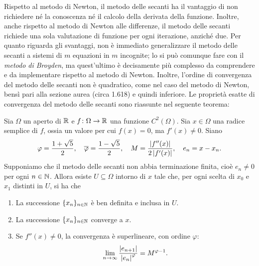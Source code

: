 Rispetto al metodo di Newton, il metodo delle secanti ha il vantaggio
di non richiedere né la conoscenza né il calcolo della derivata della funzione.
Inoltre, anche rispetto al metodo di Newton alle differenze,
il metodo delle secanti richiede una sola valutazione di funzione
per ogni iterazione, anziché due.
Per quanto riguarda gli svantaggi, non è immediato generalizzare
il metodo delle secanti a sistemi di $m$ equazioni in $m$ incognite;
lo si può comunque fare con il \emph{metodo di Broyden},
ma quest'ultimo è decisamente più complesso da comprendere
e da implementare rispetto al metodo di Newton.
Inoltre, l'ordine di convergenza del metodo delle secanti non è quadratico,
come nel caso del metodo di Newton, bensì pari alla sezione aurea
(circa 1.618) e quindi inferiore.
Le proprietà esatte di convergenza del metodo delle secanti sono riassunte
nel seguente teorema:

\begin{teor} \label{teor:convergenza-superlineare-secanti}
Sia $\Omega$ un aperto di $\mathbb{R}$ e $f \colon \Omega \to \mathbb{R}$ una funzione $C^2(\Omega)$.
Sia $x \in \Omega$ una radice semplice di $f$,
ossia un valore per cui $f(x) = 0$, ma $f'(x) \neq 0$.
Siano
\[
\varphi = \frac{1+\sqrt{5}}{2},
\quad \overline{\varphi} = \frac{1-\sqrt{5}}{2},
\quad M = \frac{\left\lvert f''(x)\right\rvert}{2\left\lvert f'(x)\right\rvert},
\quad e_n = x - x_n.
\]
Supponiamo che il metodo delle secanti non
abbia terminazione finita, cioè $e_n \neq 0$ per ogni $n \in \mathbb{N}$.
Allora esiste $U \subseteq \Omega$ intorno di $x$ tale che,
per ogni scelta di $x_0$ e $x_1$ distinti in $U$, si ha che
\begin{enumerate}
\item La successione $\{x_n\}_{n\in\mathbb{N}}$ è ben definita
	e inclusa in $U$.
\item La successione $\{x_n\}_{n\in\mathbb{N}}$ converge a $x$.
\item Se $f''(x) \neq 0$, la convergenza è superlineare, con ordine $\varphi$:
	\[ \lim_{n \to \infty} \frac{\left\lvert e_{n+1}\right\rvert}{\left\lvert e_n\right\rvert^\varphi}
	= M^{\varphi-1}. \]
\end{enumerate}
\end{teor}

